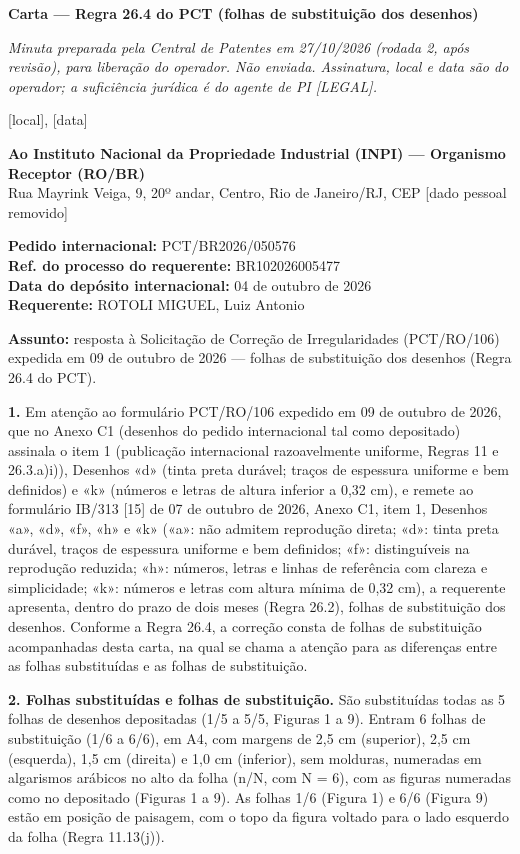 \documentclass[a4paper,11pt]{article}
\begin{document}
\begin{center}{\large\bfseries Carta --- Regra 26.4 do PCT (folhas de substituição dos desenhos)}\end{center}

{\small\itshape Minuta preparada pela Central de Patentes em 27/10/2026 (rodada 2, após revisão), para liberação do operador. Não enviada. Assinatura, local e data são do operador; a suficiência jurídica é do agente de PI [LEGAL].}

[local], [data]

\textbf{Ao Instituto Nacional da Propriedade Industrial (INPI) --- Organismo Receptor (RO/BR)}\\ Rua Mayrink Veiga, 9, 20º andar, Centro, Rio de Janeiro/RJ, CEP [dado pessoal removido]

\textbf{Pedido internacional:} PCT/BR2026/050576\\ \textbf{Ref. do processo do requerente:} BR102026005477\\ \textbf{Data do depósito internacional:} 04 de outubro de 2026\\ \textbf{Requerente:} ROTOLI MIGUEL, Luiz Antonio

\textbf{Assunto:} resposta à Solicitação de Correção de Irregularidades (PCT/RO/106) expedida em 09 de outubro de 2026 --- folhas de substituição dos desenhos (Regra 26.4 do PCT).

\textbf{1.} Em atenção ao formulário PCT/RO/106 expedido em 09 de outubro de 2026, que no Anexo C1 (desenhos do pedido internacional tal como depositado) assinala o item 1 (publicação internacional razoavelmente uniforme, Regras 11 e 26.3.a)i)), Desenhos «d» (tinta preta durável; traços de espessura uniforme e bem definidos) e «k» (números e letras de altura inferior a 0,32 cm), e remete ao formulário IB/313 [15] de 07 de outubro de 2026, Anexo C1, item 1, Desenhos «a», «d», «f», «h» e «k» («a»: não admitem reprodução direta; «d»: tinta preta durável, traços de espessura uniforme e bem definidos; «f»: distinguíveis na reprodução reduzida; «h»: números, letras e linhas de referência com clareza e simplicidade; «k»: números e letras com altura mínima de 0,32 cm), a requerente apresenta, dentro do prazo de dois meses (Regra 26.2), folhas de substituição dos desenhos. Conforme a Regra 26.4, a correção consta de folhas de substituição acompanhadas desta carta, na qual se chama a atenção para as diferenças entre as folhas substituídas e as folhas de substituição.

\textbf{2. Folhas substituídas e folhas de substituição.} São substituídas todas as 5 folhas de desenhos depositadas (1/5 a 5/5, Figuras 1 a 9). Entram 6 folhas de substituição (1/6 a 6/6), em A4, com margens de 2,5 cm (superior), 2,5 cm (esquerda), 1,5 cm (direita) e 1,0 cm (inferior), sem molduras, numeradas em algarismos arábicos no alto da folha (n/N, com N = 6), com as figuras numeradas como no depositado (Figuras 1 a 9). As folhas 1/6 (Figura 1) e 6/6 (Figura 9) estão em posição de paisagem, com o topo da figura voltado para o lado esquerdo da folha (Regra 11.13(j)).
\end{document}
